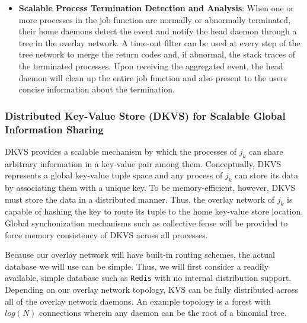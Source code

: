 \documentclass[10pt]{article}
\begin{document}
\begin{itemize}
\item{{\bf Scalable Process Termination Detection and Analysis}: When one or more processes
in the job function are normally or abnormally terminated, their home daemons detect the event and notify 
the head daemon through a tree in the overlay network. A time-out filter can be used at every step of 
the tree network to merge the return codes and, if abnormal, the stack traces of 
the terminated processes. Upon receiving the aggregated
event, the head daemon will clean up the entire job function and also present 
to the users concise information about the termination.}

\end{itemize}

\subsubsection{Distributed Key-Value Store (DKVS) for Scalable Global Information Sharing}
\label{sect:dkvs}
DKVS provides a scalable mechanism by which the processes of $j_k$ can
share arbitrary information in a key-value pair among them. 
Conceptually, DKVS represents a global key-value tuple space 
and any process of $j_k$ can store its data by associating them 
with a unique key. To be memory-efficient,
however, DKVS must store the data in a distributed
manner. Thus, the overlay network of $j_k$ is capable of hashing the key 
to route its tuple to the home key-value store location. Global synchonization
mechanisms such as collective fense will be provided to force 
memory consistency of DKVS across all processes. 

Because our overlay network will have built-in routing 
schemes, the actual database we will use can be simple. 
Thus, we will first consider a readily available, simple 
database such as {\tt Redis} with no internal distribution support.
Depending on our overlay network topology, 
KVS can be fully distributed across all of the overlay network daemons. 
An example topology is a forest 
with $log(N)$ connections wherein any daemon can be
the root of a binomial tree. 
\end{document}
